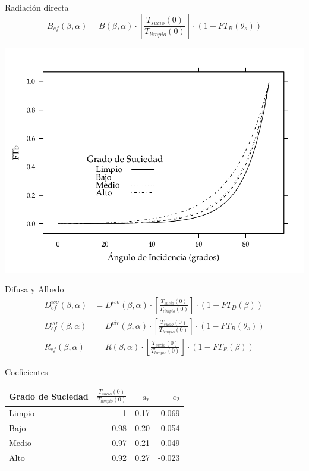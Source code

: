 \documentclass[xcolor={usenames,svgnames,dvipsnames}]{beamer}
\begin{document}
\begin{frame}[label={sec:org9783dbf}]{Radiación directa}
\[B_{ef}(\beta,\alpha)=B(\beta,\alpha)\cdot\left[\frac{T_{sucio}(0)}{T_{limpio}(0)}\right]\cdot (1-FT_{B}(\theta_{s}))\]

\begin{center}
\includegraphics[width=.9\linewidth]{../figs/Suciedad.pdf}
\end{center}
\end{frame}

\begin{frame}[label={sec:org3ebeecf}]{Difusa y Albedo}
\begin{align*}
D_{ef}^{iso}(\beta,\alpha) &= D^{iso}(\beta,\alpha)\cdot\left[\frac{T_{sucio}(0)}{T_{limpio}(0)}\right]\cdot(1-FT_{D}(\beta))\\
D_{ef}^{cir}(\beta,\alpha) &= D^{cir}(\beta,\alpha)\cdot\left[\frac{T_{sucio}(0)}{T_{limpio}(0)}\right]\cdot(1-FT_{B}(\theta_{s}))\\
R_{ef}(\beta,\alpha) &= R(\beta,\alpha)\cdot\left[\frac{T_{sucio}(0)}{T_{limpio}(0)}\right]\cdot(1-FT_{R}(\beta))
\end{align*}
\end{frame}
\begin{frame}[label={sec:org1340bbf}]{Coeficientes}
\begin{center}
\begin{tabular}{lrrr}
Grado de Suciedad & \(\frac{T_{sucio}(0)}{T_{limpio}(0)}\) & \(a_{r}\) & \(c_{2}\)\\
\hline
Limpio & 1 & 0.17 & -0.069\\
Bajo & 0.98 & 0.20 & -0.054\\
Medio & 0.97 & 0.21 & -0.049\\
Alto & 0.92 & 0.27 & -0.023\\
\end{tabular}
\end{center}
\end{frame}
\end{document}
